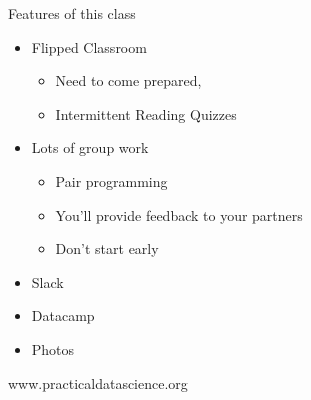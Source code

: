 \documentclass[11pt]{beamer}
\begin{document}
\begin{frame}[c]{Features of this class}
\begin{itemize}
	\item Flipped Classroom
	\begin{itemize}
		\pause \item Need to come prepared,
		\pause \item Intermittent Reading Quizzes
	\end{itemize}
	\pause \item Lots of group work
	\begin{itemize}
		\pause \item Pair programming
		\pause \item You'll provide feedback to your partners
		\pause \item Don't start early
	\end{itemize}
	\pause \item Slack
	\pause \item Datacamp
	\pause \item Photos
\end{itemize}
\end{frame}


\begin{frame}[c]{}
	\begin{center}
www.practicaldatascience.org
	\end{center}
\end{frame}
\end{document}
